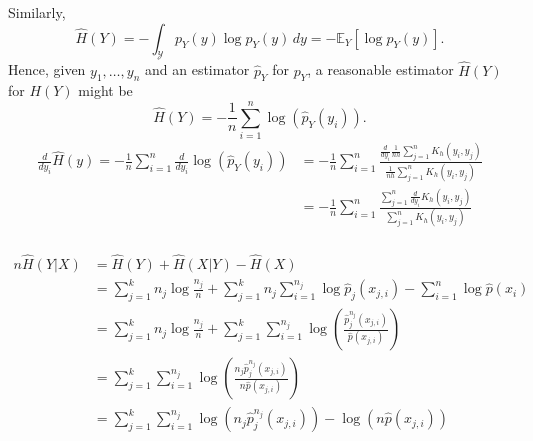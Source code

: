 \documentclass{article}
\newcommand{\Y}{\mathcal{Y}}                        %
\newcommand{\E}{\mathbb{E}}                         %
\begin{document}
Similarly,
\[\hat H(Y)
    = -\int_\Y p_Y(y) \log p_Y(y) \, dy
    = -\E_Y \left[ \log p_Y(y) \right].
\]
Hence, given $y_1,\dots,y_n$ and an estimator $\hat p_Y$ for $p_Y$, a reasonable
estimator $\hat H(Y)$ for $H(Y)$ might be 
\[\hat H(Y) = - \frac{1}{n} \sum_{i = 1}^n \log \left( \hat p_Y(y_i) \right).\]
\begin{align*}
\frac{d}{dy_i} \hat H(y)
    = - \frac{1}{n} \sum_{i = 1}^n
                        \frac{d}{dy_i} \log \left( \hat p_Y(y_i) \right)
 &  = - \frac{1}{n} \sum_{i = 1}^n
                        \frac{\frac{d}{dy_i} \frac{1}{nh} \sum_{j = 1}^n K_h(y_i,y_j)}
                             {\frac{1}{nh} \sum_{j = 1}^n K_h(y_i,y_j)}  \\
 &  = - \frac{1}{n} \sum_{i = 1}^n
                        \frac{\sum_{j = 1}^n \frac{d}{dy_i} K_h(y_i,y_j)}
                             {\sum_{j = 1}^n K_h(y_i,y_j)}  \\
\end{align*}

\begin{align*}
n \hat H(Y | X)
 &  = \hat H(Y) + \hat H(X | Y) - \hat H(X) \\
 &  = \sum_{j = 1}^k n_j \log\frac{n_j}{n}
    + \sum_{j = 1}^k n_j \sum_{i = 1}^{n_j} \log \hat p_j(x_{j,i}) 
    - \sum_{i = 1}^n \log \hat p(x_i)   \\
 &  = \sum_{j = 1}^k n_j \log\frac{n_j}{n}
    + \sum_{j = 1}^k \sum_{i = 1}^{n_j}
        \log \left( \frac{\hat p_j^{n_j}(x_{j,i})}{\hat p(x_{j,i})} \right) \\
 &  = \sum_{j = 1}^k \sum_{i = 1}^{n_j}
        \log \left( \frac{n_j \hat p_j^{n_j}(x_{j,i})}{n\hat p(x_{j,i})} \right) \\
 &  = \sum_{j = 1}^k \sum_{i = 1}^{n_j}
        \log(n_j \hat p_j^{n_j}(x_{j,i})) - \log(n\hat p(x_{j,i})) \\
\end{align*}

%
%
\end{document}
